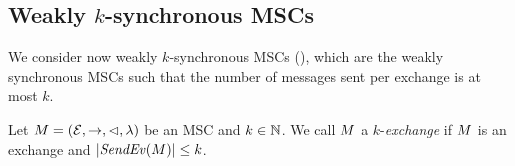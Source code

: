\subsection{Weakly \texorpdfstring{$k$}{k}-synchronous MSCs}

We consider now weakly $k$-synchronous MSCs (\cite{BolligGFLLS21}), which are the weakly synchronous MSCs such that the number of messages sent per exchange is at most $k$.

\begin{definition}[$k$-exchange]\label{def:weak-k-synchr}
Let $M = (\mathcal{E},\to,\lhd,\lambda)$ be an MSC
and $k \in \mathbb{N}$.
We call $M$ a $k$-\emph{exchange} if
$M$ is an exchange and $| \mathit{SendEv}(M) | \le k$.
\end{definition}

